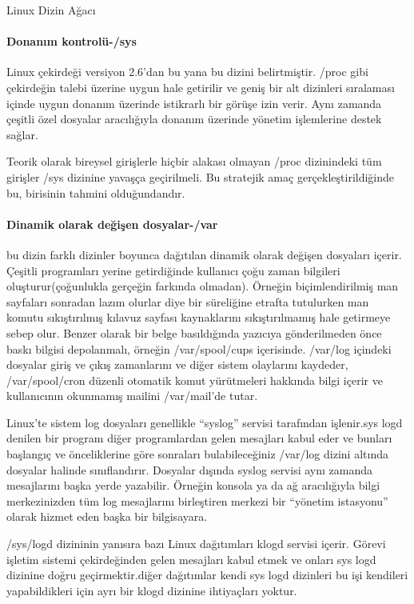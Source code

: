 \begin{section}{Linux Dizin Ağacı}
\paragraph{Donanım kontrolü-/sys}{Linux çekirdeği  versiyon 2.6’dan bu yana bu dizini belirtmiştir. /proc gibi çekirdeğin talebi üzerine uygun hale getirilir ve geniş bir alt dizinleri sıralaması içinde uygun donanım üzerinde istikrarlı bir görüşe izin verir. Aynı zamanda çeşitli özel dosyalar aracılığıyla donanım üzerinde yönetim işlemlerine destek sağlar.}

Teorik olarak bireysel girişlerle hiçbir alakası olmayan /proc dizinindeki tüm girişler /sys dizinine yavaşça geçirilmeli. Bu stratejik amaç gerçekleştirildiğinde bu,  birisinin tahmini olduğundandır.

\paragraph{Dinamik olarak değişen dosyalar-/var}{bu dizin farklı dizinler boyunca dağıtılan dinamik olarak değişen dosyaları içerir. Çeşitli programları yerine getirdiğinde kullanıcı çoğu zaman bilgileri oluşturur(çoğunlukla gerçeğin farkında olmadan). Örneğin biçimlendirilmiş man sayfaları sonradan lazım olurlar diye bir süreliğine etrafta tutulurken man komutu sıkıştırılmış kılavuz sayfası kaynaklarını sıkıştırılmamış hale getirmeye sebep olur. Benzer olarak bir belge basıldığında yazıcıya gönderilmeden önce baskı bilgisi depolanmalı, örneğin /var/spool/cups içerisinde. /var/log içindeki dosyalar giriş ve çıkış zamanlarını ve diğer sistem olaylarını kaydeder, /var/spool/cron düzenli otomatik komut yürütmeleri hakkında bilgi içerir ve kullanıcının okunmamış mailini /var/mail’de tutar.}

Linux’te sistem log dosyaları genellikle “syslog” servisi tarafından işlenir.sys logd denilen bir program diğer programlardan gelen  mesajları kabul eder ve bunları başlangıç ve önceliklerine göre sonraları bulabileceğiniz /var/log dizini altında dosyalar halinde sınıflandırır. Dosyalar dışında syslog servisi aynı zamanda mesajlarını başka yerde yazabilir. Örneğin konsola ya da ağ aracılığıyla bilgi merkezinizden tüm log mesajlarını birleştiren merkezi bir “yönetim  istasyonu” olarak hizmet eden başka bir bilgisayara.

/sys/logd dizininin yanısıra bazı Linux dağıtımları klogd servisi içerir. Görevi işletim sistemi çekirdeğinden gelen mesajları kabul etmek ve onları sys logd dizinine doğru geçirmektir.diğer dağıtımlar kendi sys logd dizinleri bu işi kendileri yapabildikleri için ayrı bir klogd dizinine ihtiyaçları yoktur.


\end{section}
